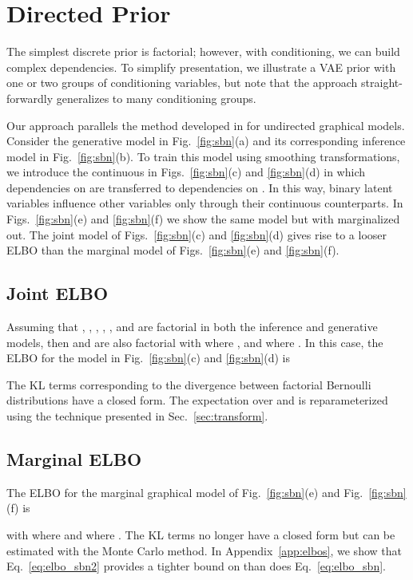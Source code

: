 \documentclass{article}
\begin{document}
\section{Directed Prior}
The simplest discrete prior is factorial; however, with conditioning, we can build complex dependencies. To simplify presentation, we illustrate
a VAE prior with one or two groups of conditioning variables, but note that the approach straight-forwardly generalizes
to many conditioning groups.

Our approach parallels the method developed in \cite{rolfe2016discrete} for undirected graphical models. 
Consider the generative model in Fig.~\ref{fig:sbn}(a) and its corresponding inference model in Fig.~\ref{fig:sbn}(b). 
To train this model using smoothing transformations, we introduce the continuous  in Figs.~\ref{fig:sbn}(c) and \ref{fig:sbn}(d) in which
dependencies on  are transferred to dependencies on . In this way, binary latent variables influence other variables only through 
their continuous counterparts. In Figs.~\ref{fig:sbn}(e) and \ref{fig:sbn}(f) we show the same model but with  marginalized out. 
The joint  
model of Figs.~\ref{fig:sbn}(c) and \ref{fig:sbn}(d) gives rise to a looser ELBO than the marginal  model of Figs.~\ref{fig:sbn}(e) and \ref{fig:sbn}(f).

\subsection{Joint ELBO}

Assuming that , , , , , and  
are factorial in both the inference and generative models, then  and  are also
factorial with  where , 
and  where .
In this case, the ELBO for the model in Fig.~\ref{fig:sbn}(c) and \ref{fig:sbn}(d) is

The KL terms corresponding to the divergence between factorial Bernoulli distributions have a closed form.
The expectation over  and  is reparameterized using the technique presented in Sec.~\ref{sec:transform}.

\subsection{Marginal ELBO} \label{sec:cont_relax}
The ELBO for the marginal graphical model of Fig.~\ref{fig:sbn}(e) and Fig.~\ref{fig:sbn}(f) is

with  where  and  where . 
The KL terms no longer have a closed form but can be estimated with the Monte Carlo method.
In Appendix~\ref{app:elbos}, we show that Eq.~\eqref{eq:elbo_sbn2} provides a tighter bound on  than does Eq.~\eqref{eq:elbo_sbn}.
\end{document}
